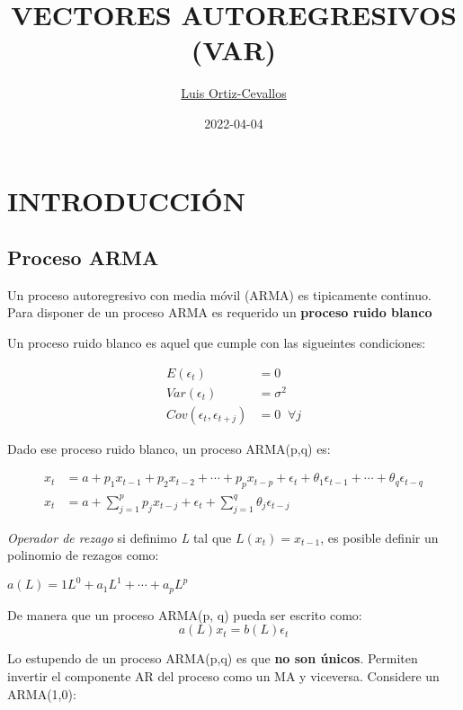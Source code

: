 \documentclass[
]{book}
\title{VECTORES AUTOREGRESIVOS (VAR)}
\author{\href{https://ortiz-cevallos.github.io/MYSELF/}{Luis Ortiz-Cevallos}}
\date{2022-04-04}
\begin{document}
\maketitle

{
\setcounter{tocdepth}{1}
\tableofcontents
}
\hypertarget{introducciuxf3n}{%
\chapter{INTRODUCCIÓN}\label{introducciuxf3n}}

\hypertarget{proceso-arma}{%
\section{Proceso ARMA}\label{proceso-arma}}

Un proceso autoregresivo con media móvil (ARMA) es tipicamente continuo. Para disponer de un proceso ARMA es requerido un \textbf{proceso ruido blanco}

Un proceso ruido blanco es aquel que cumple con las sigueintes condiciones:

\begin{align}
E(\epsilon_{t})&=0\\
Var(\epsilon_{t})&=\sigma^{2}\\
Cov(\epsilon_{t}, \epsilon_{t+j})&=0\;\; \forall j
\end{align}

Dado ese proceso ruido blanco, un proceso ARMA(p,q) es:

\begin{align}
x_{t}&= a+p_{1}x_{t-1}+p_{2}x_{t-2}+\cdots+p_{p}x_{t-p}+\epsilon_{t}+\theta_{1}\epsilon_{t-1}+\cdots+\theta_{q}\epsilon_{t-q}\\
x_{t}&= a+\sum_{j=1}^{p}p_{j}x_{t-j}+\epsilon_{t}+\sum_{j=1}^{q}\theta_{j}\epsilon_{t-j}
\end{align}

\emph{Operador de rezago} si definimo \emph{L} tal que \(L(x_{t})=x_{t-1}\), es posible definir un polinomio de rezagos como:

\(a(L)=1L^{0}+a_{1}L^{1}+\cdots+a_{p}L^{p}\)

De manera que un proceso ARMA(p, q) pueda ser escrito como:
\begin{equation}
a(L)x_{t}=b(L)\epsilon_{t}
\end{equation}

Lo estupendo de un proceso ARMA(p,q) es que \textbf{no son únicos}. Permiten invertir el componente AR del proceso como un MA y viceversa. Considere un ARMA(1,0):
\end{document}
